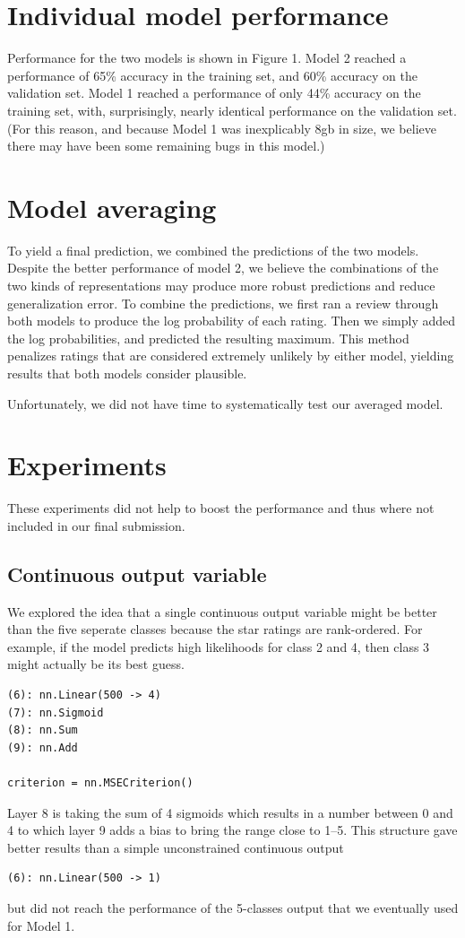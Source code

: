 \documentclass{article} %
\begin{document}
\section{Individual model performance}
Performance for the two models is shown in Figure 1.   Model 2 reached a performance of 65\% accuracy in the training set,
and 60\% accuracy on the validation set. Model 1 reached a performance
of only 44\% accuracy on the training set, with, surprisingly, nearly
identical performance on the validation set. (For this reason, and
because Model 1 was inexplicably 8gb in size, we believe there may
have been some remaining bugs in this model.)


\section{Model averaging}
To yield a final prediction, we combined the predictions of the two
models. Despite the better performance of model 2, we believe the
combinations of the two kinds of representations may produce more
robust predictions and reduce generalization error. To combine the
predictions, we first ran a review through both models to produce the
log probability of each rating. Then we simply added the log
probabilities, and predicted the resulting maximum. This method
penalizes ratings that are considered extremely unlikely by either
model, yielding results that both models consider plausible.

Unfortunately, we did not have time to systematically test our
averaged model.

\section{Experiments}


These experiments did not help to boost the performance and thus where not included in our final submission.

\subsection{Continuous output variable}
We explored the idea that a single continuous output variable might be better than the five seperate classes because the star ratings are rank-ordered. 
For example, if the model predicts high likelihoods for class 2 and 4, then class 3 might actually be its best guess.
\begin{verbatim}
(6): nn.Linear(500 -> 4)
(7): nn.Sigmoid
(8): nn.Sum
(9): nn.Add

criterion = nn.MSECriterion()
\end{verbatim}
Layer 8 is taking the sum of 4 sigmoids which results in a number between 0 and 4 to which layer 9 adds a bias to bring the range close to 1--5.
This structure gave better results than a simple unconstrained continuous output 
\begin{verbatim}
(6): nn.Linear(500 -> 1)
\end{verbatim}
but did not reach the performance of the 5-classes output that we eventually used for Model 1.
\end{document}
